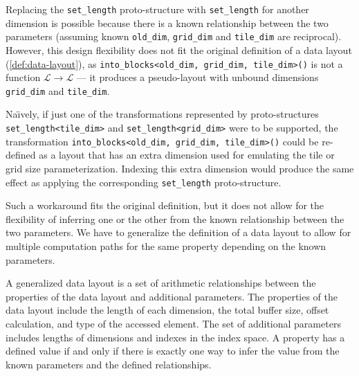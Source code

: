 
Replacing the \lstinline{set_length} proto-structure with \lstinline{set_length} for another dimension is possible because there is a known relationship between the two parameters (assuming known \lstinline{old_dim}, \lstinline{grid_dim} and \lstinline{tile_dim} are reciprocal). However, this design flexibility does not fit the original definition of a data layout (\cref{def:data-layout}), as \lstinline{into_blocks<old_dim, grid_dim, tile_dim>()} is not a function $\mathcal{L} \to \mathcal{L}$ --- it produces a pseudo-layout with unbound dimensions \lstinline{grid_dim} and \lstinline{tile_dim}.

Na\"{\i}vely, if just one of the transformations represented by proto-structures \lstinline{set_length<tile_dim>} and \lstinline{set_length<grid_dim>} were to be supported, the transformation \lstinline{into_blocks<old_dim, grid_dim, tile_dim>()} could be re-defined as a layout that has an extra dimension used for emulating the tile or grid size parameterization. Indexing this extra dimension would produce the same effect as applying the corresponding \lstinline{set_length} proto-structure. 

Such a workaround fits the original definition, but it does not allow for the flexibility of inferring one or the other from the known relationship between the two parameters. We have to generalize the definition of a data layout to allow for multiple computation paths for the same property depending on the known parameters.

\begin{defn}\label{def:generalized-data-layout} A generalized data layout is a set of arithmetic relationships between the properties of the data layout and additional parameters. The properties of the data layout include the length of each dimension, the total buffer size, offset calculation, and type of the accessed element. The set of additional parameters includes lengths of dimensions and indexes in the index space. A property has a defined value if and only if there is exactly one way to infer the value from the known parameters and the defined relationships.
\end{defn}

